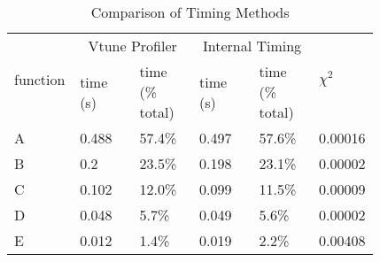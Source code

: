         \begin{table}[H]
        \begin{center}
        \begin{tabular}{|m{0.09\linewidth}|m{0.16\linewidth}|m{0.16\linewidth}|m{0.16\linewidth}|m{0.16\linewidth}|m{0.09\linewidth}|}
        \hline
        \multirow{2}{*}{function} & \multicolumn{2}{c|}{Vtune Profiler} & \multicolumn{2}{c|}{Internal Timing}  & \multirow{2}{*}{$\chi^2$}\\
        \cline{2-5}
                    & time (s)  & time (\% total) & time (s) & time (\% total)  &   \\
        \hline
        A       & 0.488     & 57.4\%        & 0.497 & 57.6\%  &  0.00016       \\
        B       & 0.2       & 23.5\%        & 0.198 & 23.1\%  &  0.00002       \\
        C       & 0.102     & 12.0\%        & 0.099 & 11.5\%  &  0.00009       \\
        D       & 0.048     & 5.7\%         & 0.049 & 5.6\%   &  0.00002       \\
        E       & 0.012     & 1.4\%         & 0.019 & 2.2\%   &  0.00408       \\
        \hline
        \end{tabular}
        \end{center}
        \caption{Comparison of Timing Methods}
        \label{table:timing_calibration}
        \end{table}